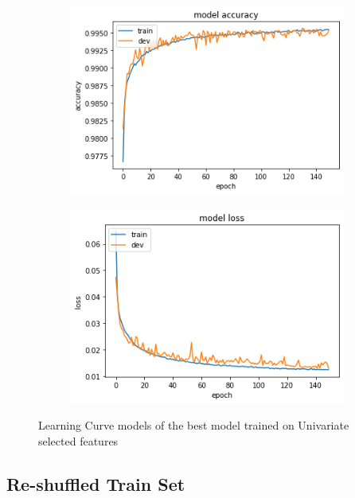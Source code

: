 \begin{figure}[h]
\center
  \begin{subfigure}[b]{0.6\columnwidth}
    \includegraphics[width=\linewidth]{img/learn5.png}
  \end{subfigure}
  \hfill %
  \begin{subfigure}[b]{0.6\columnwidth}
 \includegraphics[width=\linewidth]{img/learn6.png}
  \end{subfigure}
\caption{Learning Curve models of the best model trained on Univariate selected features}
\end{figure}


\subsection{Re-shuffled Train Set}
\label{subsec:porcata}

